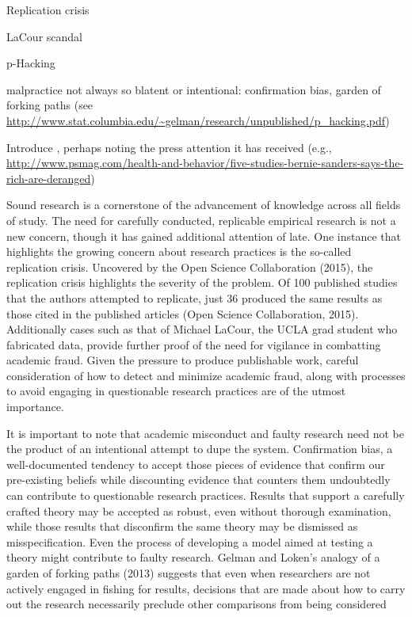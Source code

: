 
Replication crisis

LaCour scandal

p-Hacking

malpractice not always so blatent or intentional: confirmation bias, garden of forking paths (see \url{http://www.stat.columbia.edu/~gelman/research/unpublished/p_hacking.pdf})

Introduce \citet{Newman2015}, perhaps noting the press attention it has received (e.g., \url{http://www.psmag.com/health-and-behavior/five-studies-bernie-sanders-says-the-rich-are-deranged})

Sound research is a cornerstone of the advancement of knowledge across all fields of study. The need for carefully conducted, replicable empirical research is not a new concern, though it has gained additional attention of late. One instance that highlights the growing concern about research practices is the so-called replication crisis. Uncovered by the Open Science Collaboration (2015), the replication crisis highlights the severity of the problem. Of 100 published studies that the authors attempted to replicate, just 36 produced the same results as those cited in the published articles (Open Science Collaboration, 2015). Additionally cases such as that of Michael LaCour, the UCLA grad student who fabricated data, provide further proof of the need for vigilance in combatting academic fraud. Given the pressure to produce publishable work, careful consideration of how to detect and minimize academic fraud, along with processes to avoid engaging in questionable research practices are of the utmost importance.

It is important to note that academic misconduct and faulty research need not be the product of an intentional attempt to dupe the system. Confirmation bias, a well-documented tendency to accept those pieces of evidence that confirm our pre-existing beliefs while discounting evidence that counters them undoubtedly can contribute to questionable research practices. Results that support a carefully crafted theory may be accepted as robust, even without thorough examination, while those results that disconfirm the same theory may be dismissed as misspecification. Even the process of developing a model aimed at testing a theory might contribute to faulty research. Gelman and Loken’s analogy of a garden of forking paths (2013) suggests that even when researchers are not actively engaged in fishing for results, decisions that are made about how to carry out the research necessarily preclude other comparisons from being considered

